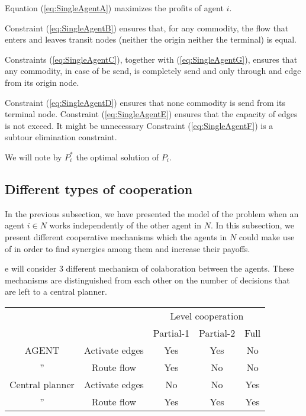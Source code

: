 \documentclass{article}
\begin{document}
Equation (\ref{eq:SingleAgentA}) maximizes the profits of agent $i$. 

Constraint (\ref{eq:SingleAgentB}) ensures that, for any commodity, the flow that enters and leaves transit nodes (neither the origin neither the terminal) is equal.


Constraints (\ref{eq:SingleAgentC}), together with (\ref{eq:SingleAgentG}), ensures that any commodity, in case of be send, is completely send and only through and edge from its origin node.

Constraint (\ref{eq:SingleAgentD}) ensures that none commodity is send from its terminal node. Constraint (\ref{eq:SingleAgentE}) ensures that the capacity of edges is not exceed. It might be unnecessary
Constraint (\ref{eq:SingleAgentF}) is a subtour elimination constraint.

We will note by $P_i^*$ the optimal solution of $P_i$.

\subsection{Different types of cooperation}

In the previous subsection, we have presented the model of the problem when an agent $i\in N$ works independently of the other
agent in $N$. In this subsection, we present different cooperative mechanisms which the agents
in $N$ could make use of in order to find synergies among them and increase their payoffs.

e will consider 3 different mechanism of colaboration between the agents. These mechanisms are distinguished from each other on
the number of decisions that are left to a central planner. 


\begin{table}[h!]
    \begin{tabular}{cc|ccc}
        & &      \multicolumn{3}{|c}{Level cooperation} \\\cline{3-5}
        & & Partial-1 & Partial-2 & Full \\ \hline
        AGENT & Activate edges & Yes & Yes & No \\
        '' & Route flow     & Yes & No & No \\\hline
        Central planner & Activate edges & No & No & Yes \\
        '' & Route flow & Yes & Yes & Yes
        \end{tabular}
    \end {table}
\end{document}

